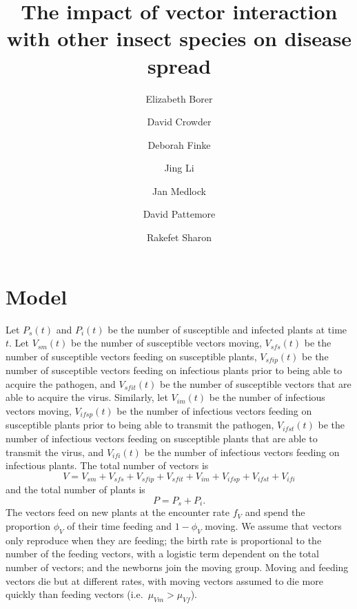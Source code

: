 \documentclass{article}
\title{The impact of vector interaction with other insect species on
  disease spread}
\author{
  Elizabeth Borer
  \and
  David Crowder
  \and
  Deborah Finke
  \and
  Jing Li
  \and
  Jan Medlock
  \and
  David Pattemore
  \and
  Rakefet Sharon
}
\begin{document}
\maketitle

\section{Model}

Let $P_s(t)$ and $P_i(t)$ be the number of susceptible and infected
plants at time $t$.  Let $V_{sm}(t)$ be the number of susceptible
vectors moving, $V_{sfs}(t)$ be the number of susceptible vectors
feeding on susceptible plants, $V_{sfip}(t)$ be the number of
susceptible vectors feeding on infectious plants prior to being able
to acquire the pathogen, and $V_{sfit}(t)$ be the number of
susceptible vectors that are able to acquire the virus.  Similarly,
let $V_{im}(t)$ be the number of infectious vectors moving,
$V_{ifsp}(t)$ be the number of infectious vectors feeding on
susceptible plants prior to being able to transmit the pathogen,
$V_{ifst}(t)$ be the number of infectious vectors feeding on
susceptible plants that are able to transmit the virus, and
$V_{ifi}(t)$ be the number of infectious vectors feeding on infectious
plants.  The total number of vectors is
\begin{equation}
  V = V_{sm} + V_{sfs} + V_{sfip} + V_{sfit} + V_{im} + V_{ifsp} +
  V_{ifst} + V_{ifi}
\end{equation}
and the total number of plants is
\begin{equation}
  P = P_s + P_i.
\end{equation}
The vectors feed on new plants at the encounter rate $f_V$ and spend the
proportion $\phi_V$ of their time feeding and $1 - \phi_V$ moving.  We
assume that vectors only reproduce when they are feeding; the birth
rate is proportional to the number of the feeding vectors, with a
logistic term dependent on the total number of vectors; and the
newborns join the moving group.  Moving and feeding vectors die but at
different rates, with moving vectors assumed to die more quickly than
feeding vectors (i.e.~$\mu_{Vm} > \mu_{Vf}$).
\end{document}
